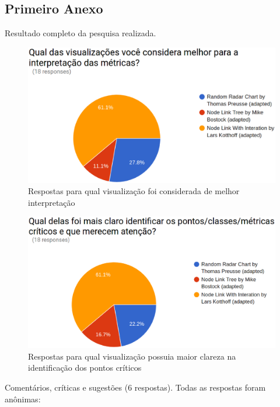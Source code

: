 \begin{anexosenv}

\partanexos

\chapter{Primeiro Anexo}
\label{chap:anexoA}

Resultado completo da pesquisa realizada.

\begin{figure}[!htb]
	\centering
    \includegraphics[keepaspectratio=true,scale=0.35]
    {figuras/res1.eps}
  \caption{Respostas para qual visualização foi considerada de melhor
  interpretação}
  \label{fig:res1}
\end{figure}

\begin{figure}[!htb]
	\centering
    \includegraphics[keepaspectratio=true,scale=0.35]
    {figuras/res2.eps}
  \caption{Respostas para qual visualização possuia maior clareza na
  identificação dos pontos críticos}
  \label{fig:res2}
\end{figure}

Comentários, críticas e sugestões (6 respostas). Todas as respostas foram
anônimas:


\end{anexosenv}
